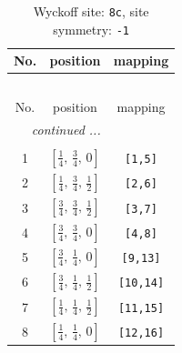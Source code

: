 \documentclass[fleqn,8pt]{jsarticle}
\begin{document}
\renewcommand{\arraystretch}{1.2}
\begin{longtable}{ccc}
\caption{Wyckoff site: {\tt 8c}, site symmetry: {\tt -1}}
 \\
 \hline \hline
No. & position & mapping \\ \hline \endfirsthead

\multicolumn{2}{l}{\tablename\ \thetable{}} \\
 \hline \hline
No. & position & mapping \\ \hline \endhead

 \hline \hline
\multicolumn{2}{r}{\footnotesize\it continued ...} \\ \endfoot

 \hline \hline
\multicolumn{2}{r}{} \\ \endlastfoot

1 & $\left[ \frac{1}{4},\, \frac{3}{4},\, 0 \right]$ & {\tt [1,5]} \\ \hline
2 & $\left[ \frac{1}{4},\, \frac{3}{4},\, \frac{1}{2} \right]$ & {\tt [2,6]} \\ \hline
3 & $\left[ \frac{3}{4},\, \frac{3}{4},\, \frac{1}{2} \right]$ & {\tt [3,7]} \\ \hline
4 & $\left[ \frac{3}{4},\, \frac{3}{4},\, 0 \right]$ & {\tt [4,8]} \\ \hline
5 & $\left[ \frac{3}{4},\, \frac{1}{4},\, 0 \right]$ & {\tt [9,13]} \\ \hline
6 & $\left[ \frac{3}{4},\, \frac{1}{4},\, \frac{1}{2} \right]$ & {\tt [10,14]} \\ \hline
7 & $\left[ \frac{1}{4},\, \frac{1}{4},\, \frac{1}{2} \right]$ & {\tt [11,15]} \\ \hline
8 & $\left[ \frac{1}{4},\, \frac{1}{4},\, 0 \right]$ & {\tt [12,16]} \\
\end{longtable}
\renewcommand{\arraystretch}{1.2}
\end{document}
